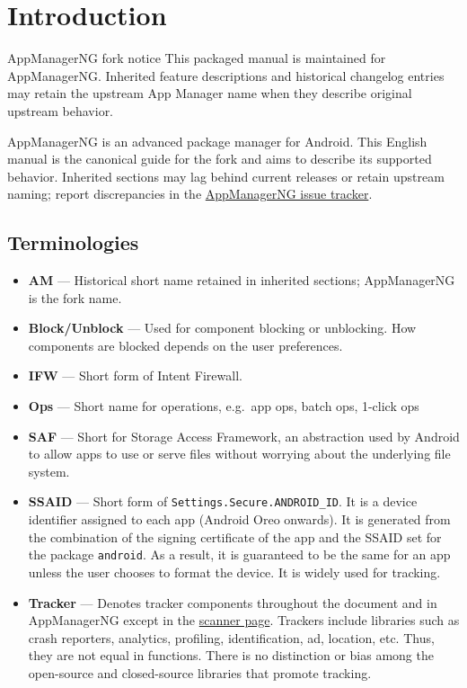 \chapter{Introduction}\label{ch:introduction} %
\begin{tip}{AppManagerNG fork notice}
    This packaged manual is maintained for AppManagerNG. Inherited feature descriptions and historical changelog
    entries may retain the upstream App Manager name when they describe original upstream behavior.
\end{tip}
AppManagerNG is an advanced package manager for Android. This English manual is the canonical guide for the fork and
aims to describe its supported behavior. Inherited sections may lag behind current releases or retain upstream naming;
report discrepancies in the
\href{https://github.com/SysAdminDoc/AppManagerNG/issues}{AppManagerNG issue tracker}.


\section{Terminologies}\label{sec:terminologies} %
\begin{itemize}
    \item \textbf{AM} --- Historical short name retained in inherited sections; AppManagerNG is the fork name.
    \item \textbf{Block/Unblock} --- Used for component blocking or unblocking. How components are blocked depends on
    the user preferences.
    \item \textbf{IFW} --- Short form of Intent Firewall.
    \item \textbf{Ops} --- Short name for operations, e.g.\ app ops, batch ops, 1-click ops
    \item \textbf{SAF} --- Short for Storage Access Framework, an abstraction used by Android to allow apps to use or
    serve files without worrying about the underlying file system.
    \item \textbf{SSAID} --- Short form of \texttt{Settings.Secure.ANDROID\_ID}. It is a device identifier assigned to
    each app (Android Oreo onwards). It is generated from the combination of the signing certificate of the app
    and the SSAID set for the package \texttt{android}. As a result, it is guaranteed to be the same for an app unless
    the user chooses to format the device. It is widely used for tracking.
    \item \textbf{Tracker} --- Denotes tracker components throughout the document and in AppManagerNG except in the
    \hyperref[sec:scanner-page]{scanner page}. Trackers include libraries such as crash reporters, analytics,
    profiling, identification, ad, location, etc. Thus, they are not equal in functions. There is no distinction or bias
    among the open-source and closed-source libraries that promote tracking.
\end{itemize}


